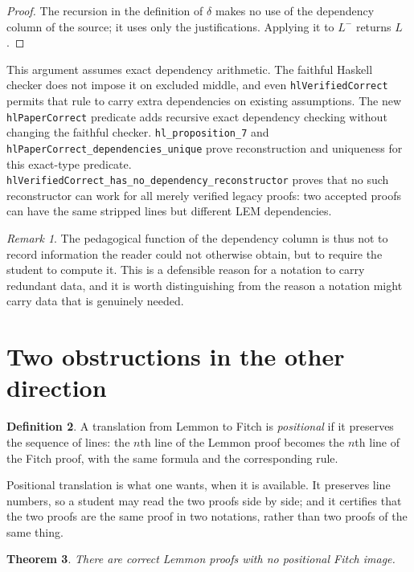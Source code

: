 \documentclass[11pt]{article}
\theoremstyle{plain}
\newtheorem{theorem}{Theorem}
\theoremstyle{definition}
\newtheorem{definition}[theorem]{Definition}
\theoremstyle{remark}
\newtheorem{remark}[theorem]{Remark}
\begin{document}
\begin{proof}
The recursion in the definition of $\delta$ makes no use of the dependency
column of the source; it uses only the justifications. Applying it to $L^{-}$
returns $L$.
\end{proof}

This argument assumes exact dependency arithmetic. The faithful Haskell
checker does not impose it on excluded middle, and even
\verb|hlVerifiedCorrect| permits that rule to carry extra dependencies on
existing assumptions. The new \verb|hlPaperCorrect| predicate adds recursive
exact dependency checking without changing the faithful checker.
\verb|hl_proposition_7| and \verb|hlPaperCorrect_dependencies_unique| prove
reconstruction and uniqueness for this exact-type predicate.
\verb|hlVerifiedCorrect_has_no_dependency_reconstructor| proves that no such
reconstructor can work for all merely verified legacy proofs: two accepted
proofs can have the same stripped lines but different LEM dependencies.

\begin{remark}
The pedagogical function of the dependency column is thus not to record
information the reader could not otherwise obtain, but to require the student
to compute it. This is a defensible reason for a notation to carry redundant
data, and it is worth distinguishing from the reason a notation might carry
data that is genuinely needed.
\end{remark}

\section{Two obstructions in the other direction}\label{sec:obstructions}

\begin{definition}
A translation from Lemmon to Fitch is \emph{positional} if it preserves the
sequence of lines: the $n$th line of the Lemmon proof becomes the $n$th line
of the Fitch proof, with the same formula and the corresponding rule.
\end{definition}

Positional translation is what one wants, when it is available. It preserves
line numbers, so a student may read the two proofs side by side; and it
certifies that the two proofs are the same proof in two notations, rather than
two proofs of the same thing.

\begin{theorem}\label{thm:notpositional}
There are correct Lemmon proofs with no positional Fitch image.
\end{theorem}
\end{document}
